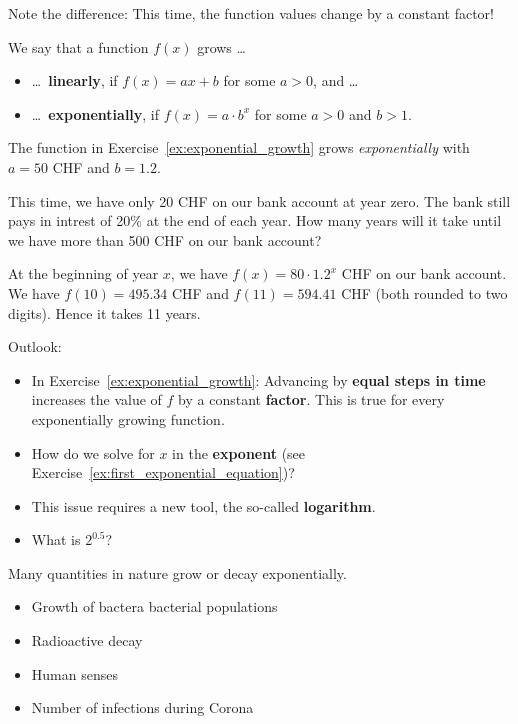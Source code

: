 \begin{tcolorbox}
	Note the difference: This time, the function values change by a constant factor!
\end{tcolorbox}
\newpage
\begin{tcolorbox}
	We say that a function $f\left(x\right)$ grows \ldots
	\begin{itemize}
		\item[] \ldots\ \textbf{linearly}, if $f\left(x\right)=ax+b$ for some $a>0$, and \ldots
		\item[] \ldots\ \textbf{exponentially}, if $f\left(x\right)=a\cdot b^x$ for some $a>0$ and $b>1$.
	\end{itemize}
\end{tcolorbox}
\begin{example}
	The function in Exercise~\ref{ex:exponential_growth} grows \textit{exponentially} with $a=50$ CHF and $b=1.2$.
\end{example}
\begin{exercise} \label{ex:first_exponential_equation}
	This time, we have only 20 CHF on our bank account at year zero.
	The bank still pays in intrest of 20\% at the end of each year.
	How many years will it take until we have more than 500 CHF on our bank account?
\end{exercise}
\begin{solution*}
	At the beginning of year $x$, we have $f\left(x\right)=80\cdot 1.2^x$ CHF on our bank account.
	We have $f\left(10\right)=495.34$ CHF and $f\left(11\right)=594.41$ CHF (both rounded to two digits).
	Hence it takes 11 years.
\end{solution*}
\begin{tcolorbox}
	Outlook:
	\begin{itemize}
		\item In Exercise~\ref{ex:exponential_growth}: Advancing by \textbf{equal steps in time} increases the value of $f$ by a constant \textbf{factor}.
		This is true for every exponentially growing function.
		\item How do we solve for $x$ in the \textbf{exponent} (see Exercise~\ref{ex:first_exponential_equation})?
		\item This issue requires a new tool, the so-called \textbf{logarithm}.
		\item What is $2^{0.5}$?
	\end{itemize}
\end{tcolorbox}
\begin{tcolorbox}
	Many quantities in nature grow or decay exponentially.
	\begin{itemize}
		\item Growth of bactera bacterial populations
		\item Radioactive decay
		\item Human senses %
		\item Number of infections during Corona
	\end{itemize}
\end{tcolorbox}
